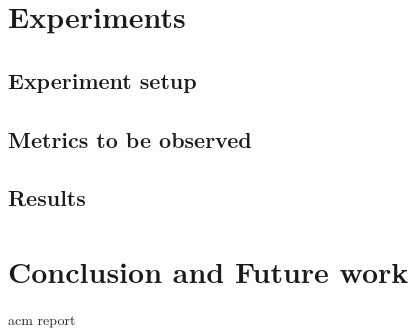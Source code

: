 \documentclass[a4paper,11pt]{report}
\begin{document}
\chapter{Experiments}
\section{Experiment setup}
\section{Metrics to be observed}
\section{Results}

\chapter{Conclusion and Future work}

\newpage
 {acm}
 {report}
\end{document}
